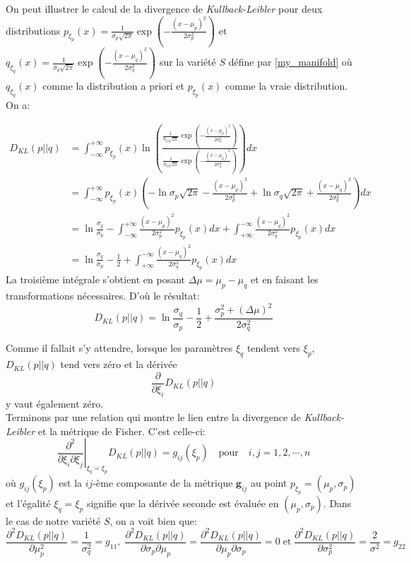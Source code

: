 \documentclass[11pt,french]{article}
\begin{document}
On peut illustrer le calcul de la divergence de \textit{Kullback-Leibler} pour deux distributions $p_{\xi_p}(x)=\frac{1}{\sigma_p\sqrt{2\pi}}\exp\left(-\frac{(x-\mu_p)^2}{2\sigma_p^2}\right)$ et $q_{\xi_q}(x)=\frac{1}{\sigma_q\sqrt{2\pi}}\exp\left(-\frac{(x-\mu_q)^2}{2\sigma_q^2}\right)$ sur la variété $S$ défine par \eqref  {my_manifold} où $q_{\xi_q}(x)$ comme la distribution a priori et $p_{\xi_p}(x)$ comme la vraie distribution. On a:

\begin{align*}
  D_{KL}(p||q)&=\int_{-\infty}^{+\infty}p_{\xi_p}(x)\ln\left(\frac{\frac{1}{\sigma_p\sqrt{2\pi}}\exp\left(-\frac{(x-\mu_p)^2}{2\sigma_p^2}\right)}{\frac{1}{\sigma_q\sqrt{2\pi}}\exp\left(-\frac{(x-\mu_q)^2}{2\sigma_q^2}\right)}\right)dx\\
  &=\int_{-\infty}^{+\infty}p_{\xi_p}(x)\left(-\ln\sigma_p\sqrt{2\pi}-\frac{(x-\mu_p)^2}{2\sigma_p^2}+\ln\sigma_q\sqrt{2\pi}+\frac{(x-\mu_q)^2}{2\sigma_q^2} \right)dx\\
  &=\ln\frac{\sigma_q}{\sigma_p}-\int_{-\infty}^{+\infty}\frac{(x-\mu_p)^2}{2\sigma_p^2}p_{\xi_p}(x)dx+\int_{+\infty}^{-\infty   }\frac{(x-\mu_q)^2}{2\sigma_q^2}p_{\xi_p}(x)dx\\
  &=\ln\frac{\sigma_q}{\sigma_p}-\frac{1}{2}+\int_{+\infty}^{-\infty   }\frac{(x-\mu_q)^2}{2\sigma_q^2}p_{\xi_p}(x)dx
\end{align*}
La troisième intégrale s'obtient en posant $\Delta\mu=\mu_p-\mu_q$ et en faisant les transformations nécessaires. D'où le résultat:
\begin{equation*}
   D_{KL}(p||q)=\ln\frac{\sigma_q}{\sigma_p}-\frac{1}{2}+\frac{\sigma_p^2+(\Delta\mu)^2}{2\sigma_q^2} 
\end{equation*}

Comme il fallait s'y attendre, lorsque les paramètres $\xi_q$ tendent vers $\xi_p$, $D_{KL}(p||q)$ tend vers zéro et la dérivée
\begin{equation*}
    \frac{\partial}{\partial\xi_i}D_{KL}(p||q)
\end{equation*}
y vaut également zéro.\\

Terminons par une relation qui montre le lien entre la divergence de \textit{Kullback-Leibler} et la métrique de Fisher. C'est celle-ci:
\begin{equation*}
    \left.\frac{\partial^2}{\partial\xi_i\partial\xi_j}\right|_{\xi_q=\xi_p}D_{KL}(p||q)=g_{ij}(\xi_p)\quad\text{pour}\quad i,j=1,2, \cdots, n
\end{equation*}
où $g_{ij}(\xi_p)$ est la $ij$-ème composante de la métrique $\textbf{g}_{ij}$ au point $p_{\xi_p}=(\mu_p, \sigma_p)$ et l'égalité $\xi_q=\xi_p$ signifie que la dérivée seconde est évaluée en $(\mu_p, \sigma_p)$. Dans le cas de notre variété $S$, on a voit bien que:
\begin{equation*}
    \frac{\partial^2D_{KL}(p||q)}{\partial\mu_p^2}=\frac{1}{\sigma_q^2}=g_{11},\;\frac{\partial^2D_{KL}(p||q)}{\partial\sigma_p\partial\mu_p}=\frac{\partial^2D_{KL}(p||q)}{\partial\mu_p\partial\sigma_p}=0\;\text{et}\;\frac{\partial^2D_{KL}(p||q)}{\partial\sigma_p^2}=\frac{2}{\sigma^2}=g_{22}
\end{equation*}\\\\
\end{document}
